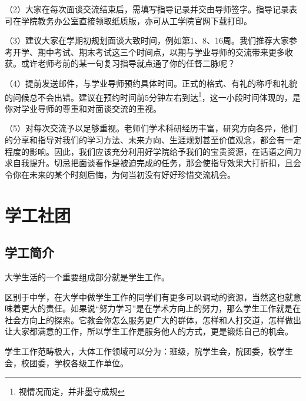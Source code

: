 \documentclass[11pt,oneside]{book}
\begin{document}
\vspace{10pt}

（2）大家在每次面谈交流结束后，需填写指导记录并交由导师签字。指导记录表可在学院教务办公室直接领取纸质版，亦可从工学院官网下载打印。

\vspace{10pt}

（3）建议大家在学期初规划面谈大致时间，例如第1、8、16周。我们推荐大家参考开学、期中考试、期末考试这三个时间点，以期与学业导师的交流带来更多收获。或许老师考前的某一句复习指导就点通了你的任督二脉呢？

\vspace{10pt}

（4）提前发送邮件，与学业导师预约具体时间。正式的格式、有礼的称呼和礼貌的问候总不会出错。建议在预约时间前5分钟左右到达\footnote{视情况而定，并非墨守成规}，这一小段时间体现的，是你对学业导师的尊重和对面谈交流的重视。

\vspace{10pt}

（5）对每次交流予以足够重视。老师们学术科研经历丰富，研究方向各异，他们的分享和指导对我们的学习方法、未来方向、生涯规划甚至价值观念，都会有一定程度的影响。因此，我们应该充分利用好学院给予我们的宝贵资源，在话语之间力求自我提升。切忌把面谈看作是被迫完成的任务，那会使指导效果大打折扣，且会令你在未来的某个时刻后悔，为何当初没有好好珍惜交流机会。

\chapter{学工社团}
\section{学工简介}
大学生活的一个重要组成部分就是学生工作。

\vspace{10pt}

区别于中学，在大学中做学生工作的同学们有更多可以调动的资源，当然这也就意味着更大的责任。如果说“努力学习”是在学术方向上的努力，那么学生工作就是在社会方向上的探索。它教会你怎么服务更广大的群体，怎样和人打交道，怎样做出让大家都满意的工作，所以学生工作是服务他人的方式，更是锻炼自己的机会。

\vspace{10pt}

学生工作范畴极大，大体工作领域可以分为：班级，院学生会，院团委，校学生会，校团委，学校各级工作单位。

\vspace{10pt}
\end{document}
